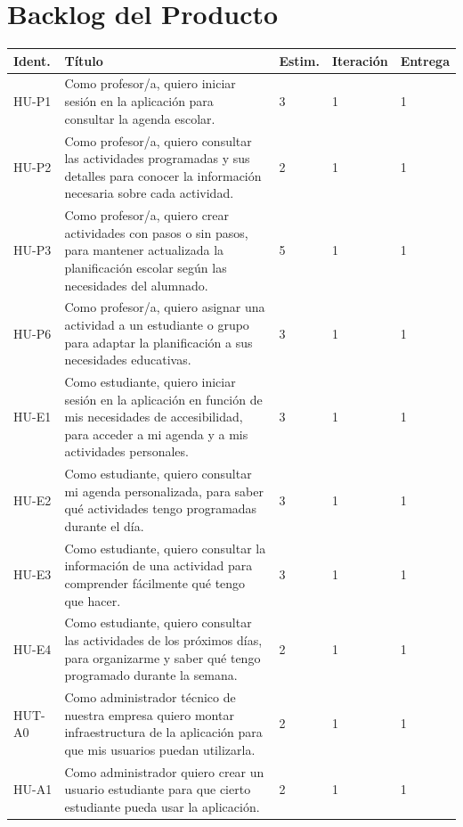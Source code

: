 
\section{Backlog del Producto}

\begin{xltabular}{\textwidth}{|p{2.2cm}|X|p{1.4cm}|p{1.7cm}|p{1.5cm}|}
\hline
{}
\textbf{Ident.} & \textbf{Título} & \textbf{Estim.} & \textbf{Iteración} & \textbf{Entrega} \\ \hline
\endhead

\hline
\endfoot

HU-P1 & Como profesor/a, quiero iniciar sesión en la aplicación para consultar la agenda escolar. & 3 & 1 & 1 \\ \hline
HU-P2 & Como profesor/a, quiero consultar las actividades programadas y sus detalles para conocer la información necesaria sobre cada actividad. & 2 & 1 & 1 \\ \hline
HU-P3 & Como profesor/a, quiero crear actividades con pasos o sin pasos, para mantener actualizada la planificación escolar según las necesidades del alumnado. & 5 & 1 & 1 \\ \hline
HU-P6 & Como profesor/a, quiero asignar una actividad a un estudiante o grupo para adaptar la planificación a sus necesidades educativas. & 3 & 1 & 1 \\ \hline
HU-E1 & Como estudiante, quiero iniciar sesión en la aplicación en función de mis necesidades de accesibilidad, para acceder a mi agenda y a mis actividades personales. & 3 & 1 & 1 \\ \hline
HU-E2 & Como estudiante, quiero consultar mi agenda personalizada, para saber qué actividades tengo programadas durante el día. & 3 & 1 & 1 \\ \hline
HU-E3 & Como estudiante, quiero consultar la información de una actividad para comprender fácilmente qué tengo que hacer. & 3 & 1 & 1 \\ \hline
HU-E4 & Como estudiante, quiero consultar las actividades de los próximos días, para organizarme y saber qué tengo programado durante la semana. & 2 & 1 & 1 \\ \hline
HUT-A0 & Como administrador técnico de nuestra empresa quiero montar infraestructura de la aplicación para que mis usuarios puedan utilizarla. & 2 & 1 & 1 \\ \hline
HU-A1 & Como administrador quiero crear un usuario estudiante para que cierto estudiante pueda usar la aplicación. & 2 & 1 & 1 \\ \hline

\end{xltabular}
